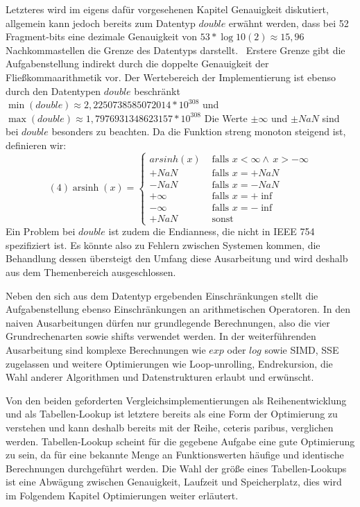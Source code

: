 \documentclass[course=erap] {aspdoc}
\begin{document}
    Letzteres wird im eigens dafür vorgesehenen Kapitel Genauigkeit diskutiert, allgemein kann jedoch bereits zum Datentyp $double$ erwähnt werden, dass bei 52 Fragment-bits eine dezimale Genauigkeit von $53*\log10(2) \approx 15,96$ Nachkommastellen die Grenze des Datentyps darstellt.~\cite{StandardforBinaryFloating}
    Erstere Grenze gibt die Aufgabenstellung indirekt durch die doppelte Genauigkeit der Fließkommaarithmetik vor.
    Der Wertebereich der Implementierung ist ebenso durch den Datentypen $double$ beschränkt $\min(double) \approx 2,2250738585072014* 10^{308}$ und $\max(double) \approx 1,7976931348623157 * 10^{308}$
    Die Werte $\pm \infty$ und $\pm NaN$ sind bei $double$ besonders zu beachten.
    Da die Funktion streng monoton steigend ist, definieren wir:
    \[(4) \operatorname{arsinh}(x) =
    \begin{cases}
        arsinh(x)     & \text{ falls } x < \infty \wedge \, x > -\infty \\
        +NaN  & \text{ falls } x = +NaN \\
        -NaN  & \text{ falls } x = -NaN \\
        +\infty     & \text{ falls } x = +\inf \\
        -\infty     & \text{ falls } x = -\inf \\
        +NaN     & \text{ sonst }

    \end{cases}\]
    Ein Problem bei $double$ ist zudem die Endianness, die nicht in IEEE 754~\cite{StandardforBinaryFloating-PointArithmetic} spezifiziert ist.
    Es könnte also zu Fehlern zwischen Systemen kommen, die Behandlung dessen übersteigt den Umfang diese Ausarbeitung und wird deshalb aus dem Themenbereich ausgeschlossen.

    Neben den sich aus dem Datentyp ergebenden Einschränkungen stellt die Aufgabenstellung ebenso Einschränkungen an arithmetischen Operatoren.
    In den naiven Ausarbeitungen dürfen nur grundlegende Berechnungen, also die vier Grundrechenarten sowie shifts verwendet werden.
    In der weiterführenden Ausarbeitung sind komplexe Berechnungen wie $exp$ oder $log$ sowie SIMD, SSE zugelassen und weitere Optimierungen wie Loop-unrolling, Endrekursion, die Wahl anderer Algorithmen und Datenstrukturen erlaubt und erwünscht.


    Von den beiden geforderten Vergleichsimplementierungen als Reihenentwicklung und als Tabellen-Lookup ist letztere bereits als eine Form der Optimierung zu verstehen und kann deshalb bereits mit der Reihe, ceteris paribus, verglichen werden.
    Tabellen-Lookup scheint für die gegebene Aufgabe eine gute Optimierung zu sein, da für eine bekannte Menge an Funktionswerten häufige und identische Berechnungen durchgeführt werden.
    Die Wahl der größe eines Tabellen-Lookups ist eine Abwägung zwischen Genauigkeit, Laufzeit und Speicherplatz, dies wird im Folgendem Kapitel Optimierungen weiter erläutert.
\end{document}

